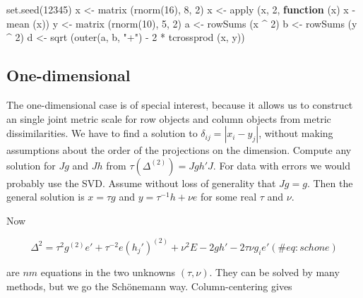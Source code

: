 \documentclass[
  12pt,
  letterpaper,
  DIV=11,
  numbers=noendperiod]{scrreprt}
\newenvironment{Shaded}{\begin{snugshade}}{\end{snugshade}}
\newcommand{\ControlFlowTok}[1]{\textcolor[rgb]{0.00,0.23,0.31}{\textbf{#1}}}
\newcommand{\DecValTok}[1]{\textcolor[rgb]{0.68,0.00,0.00}{#1}}
\newcommand{\FunctionTok}[1]{\textcolor[rgb]{0.28,0.35,0.67}{#1}}
\newcommand{\NormalTok}[1]{\textcolor[rgb]{0.00,0.23,0.31}{#1}}
\newcommand{\OtherTok}[1]{\textcolor[rgb]{0.00,0.23,0.31}{#1}}
\newcommand{\SpecialCharTok}[1]{\textcolor[rgb]{0.37,0.37,0.37}{#1}}
\newcommand{\StringTok}[1]{\textcolor[rgb]{0.13,0.47,0.30}{#1}}
\theoremstyle{remark}
\begin{document}
\begin{Shaded}
\begin{Highlighting}[]
\FunctionTok{set.seed}\NormalTok{(}\DecValTok{12345}\NormalTok{)}
\NormalTok{x }\OtherTok{\textless{}{-}} \FunctionTok{matrix}\NormalTok{ (}\FunctionTok{rnorm}\NormalTok{(}\DecValTok{16}\NormalTok{), }\DecValTok{8}\NormalTok{, }\DecValTok{2}\NormalTok{)}
\NormalTok{x }\OtherTok{\textless{}{-}} \FunctionTok{apply}\NormalTok{ (x, }\DecValTok{2}\NormalTok{, }\ControlFlowTok{function}\NormalTok{ (x) x }\SpecialCharTok{{-}} \FunctionTok{mean}\NormalTok{ (x))}
\NormalTok{y }\OtherTok{\textless{}{-}} \FunctionTok{matrix}\NormalTok{ (}\FunctionTok{rnorm}\NormalTok{(}\DecValTok{10}\NormalTok{), }\DecValTok{5}\NormalTok{, }\DecValTok{2}\NormalTok{)}
\NormalTok{a }\OtherTok{\textless{}{-}} \FunctionTok{rowSums}\NormalTok{ (x }\SpecialCharTok{\^{}} \DecValTok{2}\NormalTok{)}
\NormalTok{b }\OtherTok{\textless{}{-}} \FunctionTok{rowSums}\NormalTok{ (y }\SpecialCharTok{\^{}} \DecValTok{2}\NormalTok{)}
\NormalTok{d }\OtherTok{\textless{}{-}} \FunctionTok{sqrt}\NormalTok{ (}\FunctionTok{outer}\NormalTok{(a, b, }\StringTok{"+"}\NormalTok{) }\SpecialCharTok{{-}} \DecValTok{2} \SpecialCharTok{*} \FunctionTok{tcrossprod}\NormalTok{ (x, y))}
\end{Highlighting}
\end{Shaded}

\subsection{One-dimensional}\label{one-dimensional}

The one-dimensional case is of special interest, because it allows us to
construct an single joint metric scale for row objects and column
objects from metric dissimilarities. We have to find a solution to
\(\delta_{ij}=|x_i-y_j|\), without making assumptions about the order of
the projections on the dimension. Compute any solution for \(Jg\) and
\(Jh\) from \(\tau(\Delta^{(2)})=Jgh'J\). For data with errors we would
probably use the SVD. Assume without loss of generality that \(Jg=g\).
Then the general solution is \(x=\tau g\) and \(y=\tau^{-1}h+\nu e\) for
some real \(\tau\) and \(\nu\).

Now

\begin{equation}
\Delta^2=\tau^2 g^{(2)}e'+\tau^{-2}e(h_j')^{(2)}+\nu^2E-2gh'-2\tau\nu g_ie'
(\#eq:schone)
\end{equation}

are \(nm\) equations in the two unknowns \((\tau,\nu)\). They can be
solved by many methods, but we go the Schönemann way. Column-centering
gives
\end{document}
